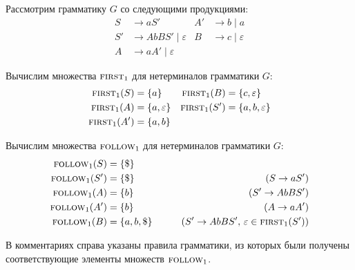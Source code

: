 \begin{example}
\label{exmpl:first_follow}
Рассмотрим грамматику $G$ со следующими продукциями:
\begin{align*}
    S  &\to a S'                     & A' &\to b \mid a \\
    S' &\to A b B S' \mid \varepsilon & B  &\to c \mid \varepsilon \\
    A  &\to a A' \mid \varepsilon
\end{align*}

Вычислим множества $\text{\textsc{first}}_{1}$ для нетерминалов грамматики $G$:
\begin{align*}
    \text{\textsc{first}}_{1}(S)  &= \{ a \}           & \text{\textsc{first}}_{1}(B)  &= \{ c, \varepsilon \} \\
    \text{\textsc{first}}_{1}(A)  &= \{ a, \varepsilon \} & \text{\textsc{first}}_{1}(S') &= \{ a, b, \varepsilon \} \\
    \text{\textsc{first}}_{1}(A') &= \{ a, b \}
\end{align*}

Вычислим множества $\text{\textsc{follow}}_{1}$ для нетерминалов грамматики $G$:
\begin{align*}
    \text{\textsc{follow}}_{1}(S)  &= \{ \$ \}                                &                                               \\
    \text{\textsc{follow}}_{1}(S') &= \{ \$ \}                                &\qquad (S \to a S')                            \\
    \text{\textsc{follow}}_{1}(A)  &= \{ b \}                                 &\qquad (S' \to A b B S')                       \\
    \text{\textsc{follow}}_{1}(A') &= \{ b \}                                 &\qquad (A \to a A')                            \\
    \text{\textsc{follow}}_{1}(B)  &= \{ a, b, \$ \}                          &\qquad (S' \to A b B S',\, \varepsilon \in \text{\textsc{first}}_{1}(S'))
\end{align*}

В комментариях справа указаны правила грамматики, из которых были получены соответствующие элементы множеств $\text{\textsc{follow}}_{1}$.
\end{example}
